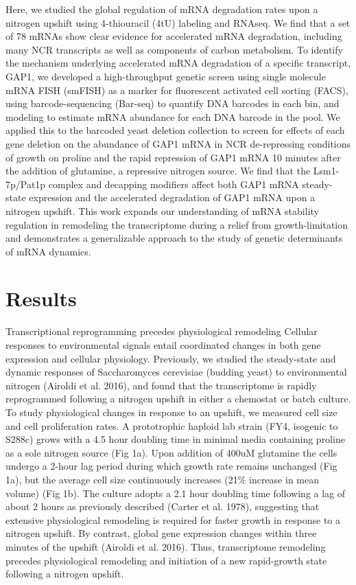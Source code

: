Here, we studied the global regulation of mRNA degradation
rates upon a nitrogen upshift using 4-thiouracil (4tU) labeling and
RNAseq. We find that a set of 78 mRNAs show clear evidence for
accelerated mRNA degradation, including many NCR transcripts as well
as components of carbon metabolism. To identify the mechanism
underlying accelerated mRNA degradation of a specific transcript,
GAP1, we developed a high-throughput genetic screen using single
molecule mRNA FISH (smFISH) as a marker for fluorescent activated cell
sorting (FACS), using barcode-sequencing (Bar-seq) to quantify DNA
barcodes in each bin, and modeling to estimate mRNA abundance for each
DNA barcode in the pool. We applied this to the barcoded yeast
deletion collection to screen for effects of each gene deletion on the
abundance of GAP1 mRNA in NCR de-repressing conditions of growth on
proline and the rapid repression of GAP1 mRNA 10 minutes after the
addition of glutamine, a repressive nitrogen source. We find that the
Lsm1-7p/Pat1p complex and decapping modifiers affect both GAP1 mRNA
steady-state expression and the accelerated degradation of GAP1 mRNA
upon a nitrogen upshift. This work expands our understanding of mRNA
stability regulation in remodeling the transcriptome during a relief
from growth-limitation and demonstrates a generalizable approach to
the study of genetic determinants of mRNA dynamics.  

\section{Results}
Transcriptional reprogramming precedes physiological remodeling
Cellular responses to environmental signals entail coordinated changes
in both gene expression and cellular physiology.  Previously, we
studied the steady-state and dynamic responses of Saccharomyces
cerevisiae (budding yeast) to environmental nitrogen (Airoldi et al.
2016), and found that the transcriptome is rapidly reprogrammed
following a nitrogen upshift in either a chemostat or batch culture.
To study physiological changes in response to an upshift, we measured
cell size and cell proliferation rates. A prototrophic haploid lab
strain (FY4, isogenic to S288c) grows with a 4.5 hour doubling time in
minimal media containing proline as a sole nitrogen source (Fig 1a).
Upon addition of 400uM glutamine the cells undergo a 2-hour lag period
during which growth rate remains unchanged (Fig 1a), but  the average
cell size continuously increases (21\% increase in mean volume)  (Fig
1b). The culture adopts a 2.1 hour doubling time following a lag of
about 2 hours as previously described (Carter et al. 1978), suggesting
that extensive physiological remodeling is required for faster growth
in response to a nitrogen upshift. By contrast, global gene expression
changes within three minutes of the upshift (Airoldi et al. 2016).
Thus, transcriptome remodeling precedes physiological remodeling and
initiation of a new rapid-growth state following a nitrogen upshift.
  


